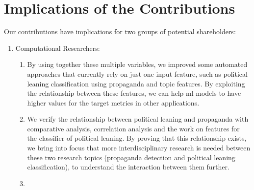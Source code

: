 \section{\statusgreen Implications of the Contributions}
\label{sec:discussion_findings_implications}


Our contributions have implications for two groups of potential shareholders:

\begin{enumerate}
    \item Computational Researchers:
          \begin{enumerate}
              \item By using together these multiple variables, we improved some automated approaches that currently rely on just one input feature, such as political leaning classification using propaganda and topic features. By exploiting the relationship between these features, we can help \acrshort{ml} models to have higher values for the target metrics in other applications.
              \item We verify the relationship between political leaning and propaganda with comparative analysis, correlation analysis and the work on features for the classifier of political leaning. By proving that this relationship exists, we bring into focus that more interdisciplinary research is needed between these two research topics (propaganda detection and political leaning classification), to understand the interaction between them further.
              \item %

\end{enumerate}
\end{enumerate}
